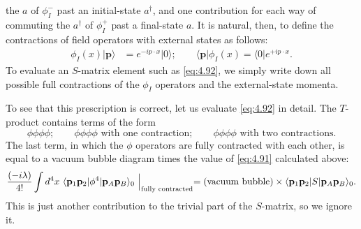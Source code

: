 the $a$ of $\phi_I^-$ past an initial-state $a^\dagger$, and one contribution
for each way of commuting the $a^\dagger$ of $\phi_I^+$ past a final-state
$a$.  It is natural, then, to define the contractions of field operators with
external states as follows:
\begin{equation}
  \begin{aligned}
    \phi_I(x)|\mathbf{p}\rangle &= e^{-ip\cdot x}|0\rangle;\qquad
    \langle\mathbf{p}|\phi_I(x) = \langle 0|e^{+ip\cdot x} .
  \end{aligned}
  \label{eq:4.94}
\end{equation}
To evaluate an $S$-matrix element such as \eqref{eq:4.92}, we simply write
down all possible full contractions of the $\phi_I$ operators and the
external-state momenta.

To see that this prescription is correct, let us evaluate \eqref{eq:4.92} in
detail.  The $T$-product contains terms of the form
\begin{equation}
  \phi\phi\phi\phi;\qquad \phi\phi\phi\phi \text{ with one contraction};
  \qquad \phi\phi\phi\phi \text{ with two contractions} .
  \label{eq:4.95}
\end{equation}
The last term, in which the $\phi$ operators are fully contracted with each
other, is equal to a vacuum bubble diagram times the value of \eqref{eq:4.91}
calculated above:
\begin{equation}
  \frac{(-i\lambda)}{4!}\int d^4x\ \langle \mathbf{p}_1\mathbf{p}_2|
    \phi^4|\mathbf{p}_A\mathbf{p}_B\rangle_0\ \Bigl|_{\text{fully contracted}}
  = (\text{vacuum bubble})\times \langle \mathbf{p}_1\mathbf{p}_2|
    S|\mathbf{p}_A\mathbf{p}_B\rangle_0 .
  \label{eq:4.96}
\end{equation}
This is just another contribution to the trivial part of the $S$-matrix, so
we ignore it.

